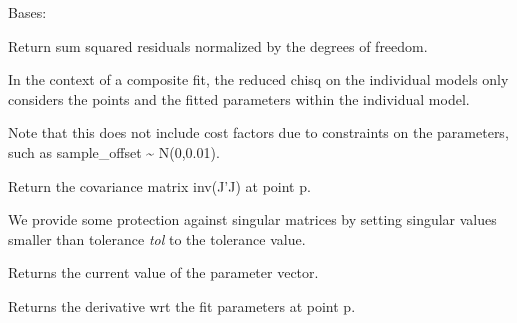 \documentclass[letterpaper,10pt,english]{sphinxmanual}
\begin{document}
\begin{fulllineitems}
\label{api/fitproblem:refl1d.fitproblem.FitProblem}
Bases: 

\begin{fulllineitems}
\label{api/fitproblem:refl1d.fitproblem.FitProblem.chisq}
Return sum squared residuals normalized by the degrees of freedom.

In the context of a composite fit, the reduced chisq on the individual
models only considers the points and the fitted parameters within
the individual model.

Note that this does not include cost factors due to constraints on
the parameters, such as sample\_offset \textasciitilde{} N(0,0.01).

\end{fulllineitems}


\begin{fulllineitems}
\label{api/fitproblem:refl1d.fitproblem.FitProblem.cov}
Return the covariance matrix inv(J'J) at point p.

We provide some protection against singular matrices by setting
singular values smaller than tolerance \emph{tol} to the tolerance
value.

\end{fulllineitems}


\begin{fulllineitems}
\label{api/fitproblem:refl1d.fitproblem.FitProblem.getp}
Returns the current value of the parameter vector.

\end{fulllineitems}


\begin{fulllineitems}
\label{api/fitproblem:refl1d.fitproblem.FitProblem.jacobian}
Returns the derivative wrt the fit parameters at point p.


\end{fulllineitems}
\end{fulllineitems}
\end{document}
